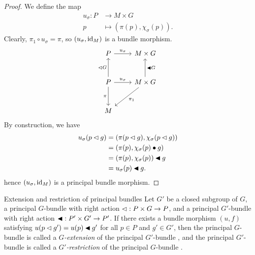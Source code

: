 \begin{proof}
    We define the map
    \begin{align*}
        u_\sigma : P &\to M \times G\\
                   p &\mapsto (\pi(p), \chi_\sigma(p)).
    \end{align*}
    Clearly, \(\pi_1 \circ u_\sigma = \pi\), so \((u_\sigma, \operatorname{id}_{M})\) is a bundle morphism.
    \begin{equation*}
        \begin{tikzcd}[column sep = normal, row sep = large]
            P \arrow{r}{u_\sigma} &M\times G\\
            P \arrow{u}{\ract G} \arrow[swap]{d}{\pi} \arrow{r}{u_\sigma} & M \times G \arrow[swap]{u}{\ractalt G} \arrow{ld}{\pi_1}\\
            M
        \end{tikzcd}
    \end{equation*}
    By construction, we have
    \begin{align*}
        u_\sigma(p \mathbin{\vartriangleleft} g) &= (\pi(p \mathbin{\vartriangleleft} g), \chi_\sigma(p \mathbin{\vartriangleleft} g))\\
                            &= (\pi(p), \chi_\sigma(p) \bullet g)\\
                            &= (\pi(p), \chi_\sigma(p)) \mathbin{\blacktriangleleft} g\\
                            &= u_\sigma(p) \mathbin{\blacktriangleleft} g.
    \end{align*}
    hence \((u_\sigma, \operatorname{id}_{M})\) is a principal bundle morphism.
\end{proof}

\begin{definition}{Extension and restriction of principal bundles}{}
    Let \(G'\) be a closed subgroup of \(G\),  a principal \(G\)-bundle with right action \(\mathbin{\vartriangleleft} : P \times G \to P\), and  a principal \(G'\)-bundle with right action \(\mathbin{\blacktriangleleft} : P' \times G' \to P'\). If there exists a bundle morphism \((u,f)\) satisfying \(u(p \mathbin{\vartriangleleft} g') = u(p) \mathbin{\blacktriangleleft} g'\) for all \(p \in P\) and \(g' \in G'\), then the principal \(G\)-bundle  is called a \emph{\(G\)-extension} of the principal \(G'\)-bundle , and the principal \(G'\)-bundle  is called a \emph{\(G'\)-restriction} of the principal \(G\)-bundle .
\end{definition}

